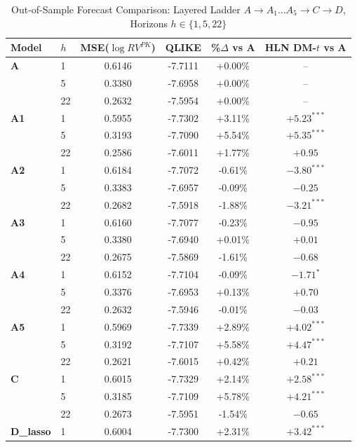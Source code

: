 
\begin{table}[htbp]
\centering
\caption{Out-of-Sample Forecast Comparison: Layered Ladder $A \to A_1\dots A_5 \to C \to D$, Horizons $h \in \{1,5,22\}$}
\label{tab:model_comparison}
\small
\begin{tabular}{llcccc}
\toprule
Model & $h$ & MSE($\log RV^{PK}$) & QLIKE & \%$\Delta$ vs A & HLN DM-$t$ vs A \\
\midrule
\textbf{A} &  1 & 0.6146 & -7.7111 & +0.00\% & -- \\
 &  5 & 0.3380 & -7.6958 & +0.00\% & -- \\
 & 22 & 0.2632 & -7.5954 & +0.00\% & -- \\
\midrule
\textbf{A1} &  1 & 0.5955 & -7.7302 & +3.11\% & $+5.23^{***}$ \\
 &  5 & 0.3193 & -7.7090 & +5.54\% & $+5.35^{***}$ \\
 & 22 & 0.2586 & -7.6011 & +1.77\% & $+0.95$ \\
\midrule
\textbf{A2} &  1 & 0.6184 & -7.7072 & -0.61\% & $-3.80^{***}$ \\
 &  5 & 0.3383 & -7.6957 & -0.09\% & $-0.25$ \\
 & 22 & 0.2682 & -7.5918 & -1.88\% & $-3.21^{***}$ \\
\midrule
\textbf{A3} &  1 & 0.6160 & -7.7077 & -0.23\% & $-0.95$ \\
 &  5 & 0.3380 & -7.6940 & +0.01\% & $+0.01$ \\
 & 22 & 0.2675 & -7.5869 & -1.61\% & $-0.68$ \\
\midrule
\textbf{A4} &  1 & 0.6152 & -7.7104 & -0.09\% & $-1.71^{*}$ \\
 &  5 & 0.3376 & -7.6953 & +0.13\% & $+0.70$ \\
 & 22 & 0.2632 & -7.5946 & -0.01\% & $-0.03$ \\
\midrule
\textbf{A5} &  1 & 0.5969 & -7.7339 & +2.89\% & $+4.02^{***}$ \\
 &  5 & 0.3192 & -7.7107 & +5.58\% & $+4.47^{***}$ \\
 & 22 & 0.2621 & -7.6015 & +0.42\% & $+0.21$ \\
\midrule
\textbf{C} &  1 & 0.6015 & -7.7329 & +2.14\% & $+2.58^{***}$ \\
 &  5 & 0.3185 & -7.7109 & +5.78\% & $+4.21^{***}$ \\
 & 22 & 0.2673 & -7.5951 & -1.54\% & $-0.65$ \\
\midrule
\textbf{D\_lasso} &  1 & 0.6004 & -7.7300 & +2.31\% & $+3.42^{***}$ \\

\end{tabular}
\end{table}
